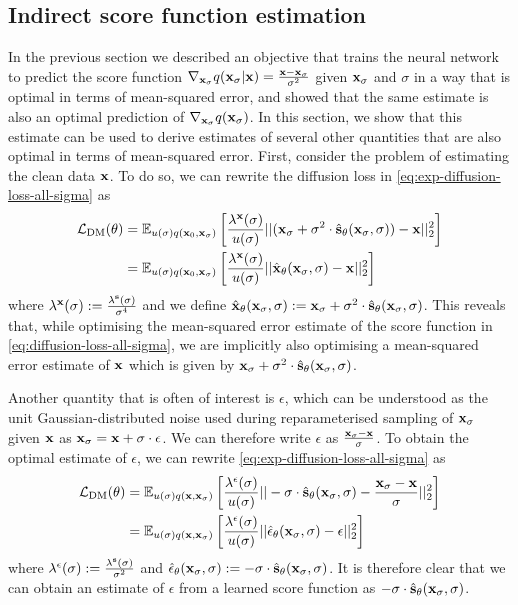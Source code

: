 \subsection{Indirect score function estimation} \label{eq:diffusion-equivalent-parameterisations}
In the previous section we described an objective that trains the neural network to predict the score function $\nabla_{{\mathbf{x}}_\sigma} q({\mathbf{x}}_\sigma|{\mathbf{x}}) = \frac{{\mathbf{x}}-{\mathbf{x}}_\sigma}{\sigma^2}$ given ${\mathbf{x}}_\sigma$ and $\sigma$ in a way that is optimal in terms of mean-squared error, and showed that the same estimate is also an optimal prediction of $\nabla_{{\mathbf{x}}_\sigma} q({\mathbf{x}}_\sigma)$. In this section, we show that this estimate can be used to derive estimates of several other quantities that are also optimal in terms of mean-squared error. First, consider the problem of estimating the clean data ${\mathbf{x}}$. To do so, we can rewrite the diffusion loss in \cref{eq:exp-diffusion-loss-all-sigma} as
\begin{align} \label{eq:x0-diffusion-loss}
    \mathcal{L}_\text{DM}(\theta) &= \mathbb{E}_{u(\sigma)q({\mathbf{x}}_0, {\mathbf{x}}_\sigma)} \left[ \frac{\lambda^{\mathbf{x}}(\sigma)}{u(\sigma)}
    || ({\mathbf{x}}_\sigma + \sigma^2 \cdot \hat{{\mathbf{s}}}_\theta({\mathbf{x}}_\sigma, \sigma)) - {\mathbf{x}} ||_2^2 \right] \\
    &= \mathbb{E}_{u(\sigma)q({\mathbf{x}}_0, {\mathbf{x}}_\sigma)} \left[ 
    \frac{\lambda^{\mathbf{x}}(\sigma)}{u(\sigma)}
    || \hat{{\mathbf{x}}}_\theta({\mathbf{x}}_\sigma, \sigma) - {\mathbf{x}} ||_2^2 \right]
\end{align}
where $\lambda^{\mathbf{x}}(\sigma) := \frac{\lambda^{\mathbf{s}}(\sigma)}{\sigma^4}$ and we define $\hat{{\mathbf{x}}}_\theta({\mathbf{x}}_\sigma, \sigma) := {\mathbf{x}}_\sigma + \sigma^2 \cdot \hat{{\mathbf{s}}}_\theta({\mathbf{x}}_\sigma, \sigma)$. This reveals that, while optimising the mean-squared error estimate of the score function in \cref{eq:diffusion-loss-all-sigma}, we are implicitly also optimising a mean-squared error estimate of ${\mathbf{x}}$ which is given by ${\mathbf{x}}_\sigma + \sigma^2 \cdot \hat{{\mathbf{s}}}_\theta({\mathbf{x}}_\sigma, \sigma)$.

Another quantity that is often of interest is $\epsilon$, which can be understood as the unit Gaussian-distributed noise used during reparameterised sampling of ${\mathbf{x}}_\sigma$ given ${\mathbf{x}}$ as ${\mathbf{x}}_\sigma = {\mathbf{x}} + \sigma \cdot \epsilon$. We can therefore write $\epsilon$ as $\frac{{\mathbf{x}}_\sigma-{\mathbf{x}}}{\sigma}$. To obtain the optimal estimate of $\epsilon$, we can rewrite \cref{eq:exp-diffusion-loss-all-sigma} as
\begin{align} \label{eq:epsilon-diffusion-loss}
    \mathcal{L}_\text{DM}(\theta) &= \mathbb{E}_{u(\sigma)q({\mathbf{x}}, {\mathbf{x}}_\sigma)} \left[ 
    \frac{\lambda^\epsilon(\sigma)}{u(\sigma)} || -\sigma \cdot \hat{{\mathbf{s}}}_\theta({\mathbf{x}}_\sigma, \sigma) - \frac{{\mathbf{x}}_\sigma-{\mathbf{x}}}{\sigma} ||_2^2 \right] \\
    &= \mathbb{E}_{u(\sigma)q({\mathbf{x}}, {\mathbf{x}}_\sigma)} \left[ 
    \frac{\lambda^\epsilon(\sigma)}{u(\sigma)} || \hat{\mathbf{\epsilon}}_\theta({\mathbf{x}}_\sigma, \sigma) - \epsilon ||_2^2 \right]
\end{align}
where $\lambda^\epsilon(\sigma) := \frac{\lambda^{\mathbf{s}}(\sigma)}{\sigma^2}$ and $\hat{\mathbf{\epsilon}}_\theta({\mathbf{x}}_\sigma, \sigma) := -\sigma \cdot \hat{{\mathbf{s}}}_\theta({\mathbf{x}}_\sigma, \sigma)$. It is therefore clear that we can obtain an estimate of $\epsilon$ from a learned score function as $-\sigma \cdot \hat{{\mathbf{s}}}_\theta({\mathbf{x}}_\sigma, \sigma)$.


